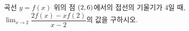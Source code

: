 곡선 $y=f(x)$ 위의 점 $(2{,}\mkern3mu\mathopen{}6)$에서의 접선의 기울기가 4일 때, $\displaystyle\lim_{x\to 2}\dfrac{2f(x)-xf(2)}{x-2}$의 값을 구하시오.
